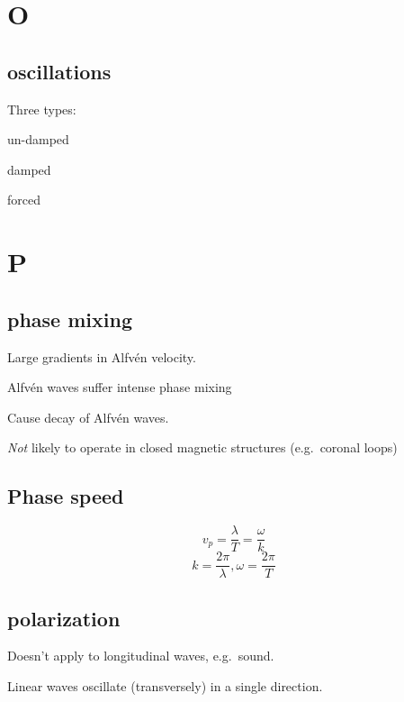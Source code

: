 \documentclass[12pt]{article}
\begin{document}
\section*{O}
\subsection*{oscillations}
Three types:
\begin{enumerate*}
    \item un-damped
    \item damped
    \item forced
\end{enumerate*}

\section*{P}

\subsection*{phase mixing}
\begin{itemize*}
    \item Large gradients in Alfv\'en velocity.
    \item Alfv\'en waves suffer intense phase mixing
    \item Cause decay of Alfv\'en waves.
    \item \emph{Not} likely to operate in closed magnetic structures
        (e.g.\ coronal loops)
\end{itemize*}

\subsection*{Phase speed}
$$ v_p = \frac{\lambda}{T} = \frac{\omega}{k} $$
$$ k = \frac{2\pi}{\lambda}, \omega = \frac{2\pi}{T} $$

\subsection*{polarization}
\begin{itemize*}
    \item Doesn't apply to longitudinal waves, e.g.\ sound.
    \item Linear waves oscillate (transversely) in a single direction.
\end{itemize*}
\end{document}
